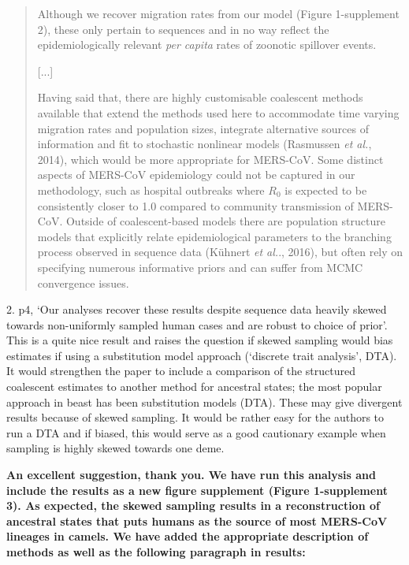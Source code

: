 \documentclass[11pt,oneside,letterpaper]{article}
\begin{document}
\begin{quotation}
Although we recover migration rates from our model (Figure 1-supplement 2), these only pertain to sequences and in no way reflect the epidemiologically relevant \textit{per capita} rates of zoonotic spillover events.

[...]

Having said that, there are highly customisable coalescent methods available that extend the methods used here to accommodate time varying migration rates and population sizes, integrate alternative sources of information and fit to stochastic nonlinear models (Rasmussen \textit{et al.}, 2014), which would be more appropriate for MERS-CoV.
Some distinct aspects of MERS-CoV epidemiology could not be captured in our methodology, such as hospital outbreaks where $R_{0}$ is expected to be consistently closer to 1.0 compared to community transmission of MERS-CoV.
Outside of coalescent-based models there are population structure models that explicitly relate epidemiological parameters to the branching process observed in sequence data (K\"{u}hnert \textit{et al.}., 2016), but often rely on specifying numerous informative priors and can suffer from MCMC convergence issues.
\end{quotation}

%
2. p4, `Our analyses recover these results despite sequence data heavily skewed towards non-uniformly sampled human cases and are robust to choice of prior'. This is a quite nice result and raises the question if skewed sampling would bias estimates if using a substitution model approach (`discrete trait analysis', DTA). It would strengthen the paper to include a comparison of the structured coalescent estimates to another method for ancestral states; the most popular approach in beast has been substitution models (DTA). These may give divergent results because of skewed sampling. It would be rather easy for the authors to run a DTA and if biased, this would serve as a good cautionary example when sampling is highly skewed towards one deme.

\textbf{An excellent suggestion, thank you. We have run this analysis and include the results as a new figure supplement (Figure 1-supplement 3). As expected, the skewed sampling results in a reconstruction of ancestral states that puts humans as the source of most MERS-CoV lineages in camels. We have added the appropriate description of methods as well as the following paragraph in results:}
\end{document}
